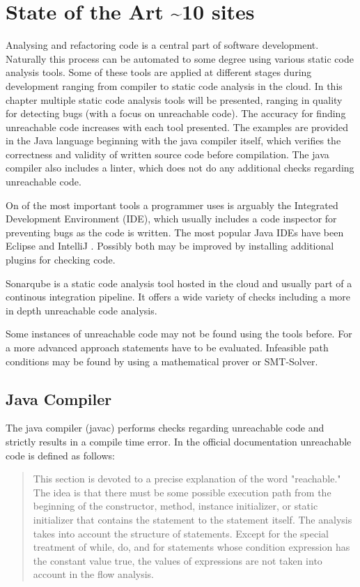 
\chapter{State of the Art \textasciitilde 10 sites}
\label{cha:state of the art}

Analysing and refactoring code is a central part of software development. Naturally this process can be automated to some degree using various static code analysis tools. 
Some of these tools are applied at different stages during development ranging from compiler to static code analysis in the cloud.
In this chapter multiple static code analysis tools will be presented, ranging in quality for detecting bugs (with a focus on unreachable code).
The accuracy for finding unreachable code increases with each tool presented. 
The examples are provided in the Java language beginning with the java compiler itself, which verifies the correctness and validity of written source code before compilation. 
The java compiler also includes a linter, which does not do any additional checks regarding unreachable code. 


On of the most important tools a programmer uses is arguably the Integrated Development Environment (IDE), which usually includes a code inspector for preventing bugs as the code is written. 
The most popular Java IDEs have been Eclipse \cite{incCommunityOpenInnovation} and IntelliJ \cite{IntelliJIDEACapable}. 
Possibly both may be improved by installing additional plugins for checking code.


Sonarqube \cite{sonarqube} is a static code analysis tool hosted in the cloud and usually part of a continous integration pipeline. It offers a wide variety of checks including a more in depth unreachable code analysis.


Some instances of unreachable code may not be found using the tools before. For a more advanced approach statements have to be evaluated. Infeasible path conditions may be found by using a mathematical prover or SMT-Solver.

\section{Java Compiler}
\label{sec:java compiler}

The java compiler (javac) performs checks regarding unreachable code and strictly results in a compile time error. 
In the official documentation \cite{Chapter14Blocks} unreachable code is defined as follows:
\begin{quote}
\label{quote:java unreachable definition}
This section is devoted to a precise explanation of the word "reachable." 
The idea is that there must be some possible execution path from the beginning of the constructor, method, instance initializer, or static initializer that contains the statement to the statement itself. The analysis takes into account the structure of statements. Except for the special treatment of while, do, and for statements whose condition expression has the constant value true, the values of expressions are not taken into account in the flow analysis.
\end{quote}

